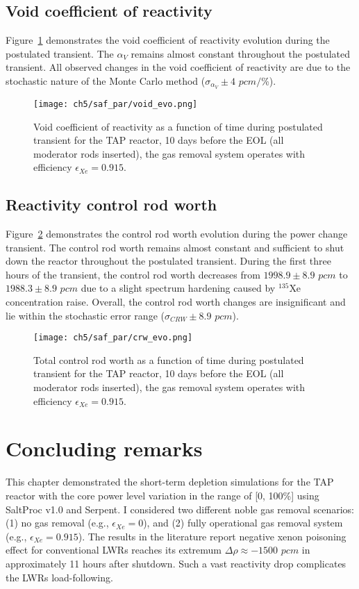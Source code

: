 \subsection{Void coefficient of reactivity}
Figure~\ref{fig:lf-tap-void-evo} demonstrates the void coefficient of 
reactivity evolution during the postulated transient. 
The $\alpha_V$ remains almost constant throughout the postulated transient. 
All observed changes in the void coefficient of reactivity are due to the
stochastic nature of the Monte Carlo method ($\sigma_{\alpha_V}\pm4$ $pcm/$\%).
\begin{figure}[htp!] %
	\centering
	\texttt{[image: ch5/saf\_par/void\_evo.png]}
	\caption{Void coefficient of reactivity as a function of time during 
	postulated transient for the \gls{TAP} reactor, 10 days before the 
	\gls{EOL} (all moderator rods inserted), the gas removal system operates 
	with efficiency $\epsilon_{Xe}=0.915$.}
	\label{fig:lf-tap-void-evo}
\end{figure}

\subsection{Reactivity control rod worth}
Figure~\ref{fig:lf-tap-crw-evo} demonstrates the control rod worth evolution 
during the power change transient. The control rod worth remains almost 
constant and sufficient to shut down the reactor throughout the postulated 
transient. During the first three hours of the transient, the control rod 
worth decreases from $1998.9\pm8.9$ $pcm$ to $1988.3\pm8.9$ $pcm$ due to a 
slight spectrum hardening caused by $^{135}$Xe concentration raise. Overall, 
the control rod worth changes are insignificant and lie within the 
stochastic error range ($\sigma_{CRW}\pm8.9$ $pcm$).
\begin{figure}[htp!] %
	\centering
	\texttt{[image: ch5/saf\_par/crw\_evo.png]}
	\caption{Total control rod worth as a function of time during postulated 
	transient for the \gls{TAP} reactor, 10 days before the \gls{EOL} (all 
	moderator rods inserted), the gas removal system operates with efficiency 
	$\epsilon_{Xe}=0.915$.}
	\label{fig:lf-tap-crw-evo}
\end{figure}



\section{Concluding remarks}
This chapter demonstrated the short-term depletion simulations for the 
\gls{TAP} reactor with the core power level variation in the range of [0, 
100\%] using SaltProc v1.0 and Serpent. I considered two different noble gas 
removal scenarios: (1) no gas removal (e.g., $\epsilon_{Xe}=0$), 
and (2) fully operational gas removal system (e.g., $\epsilon_{Xe}=0.915$). 
The results in the literature report negative xenon poisoning effect for 
conventional \glspl{LWR} reaches its extremum $\Delta\rho\approx-1500$ $pcm$ 
in approximately 11 hours after shutdown. Such a vast reactivity drop 
complicates the \glspl{LWR} load-following.


